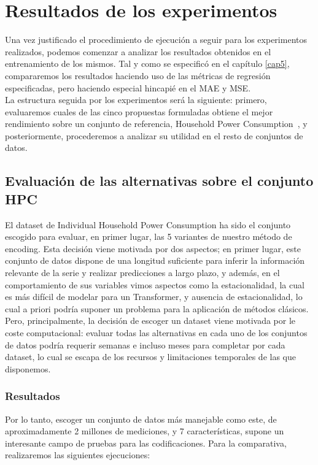 \section{Resultados de los experimentos}

Una vez justificado el procedimiento de ejecución a seguir para los experimentos realizados, podemos comenzar a analizar los resultados obtenidos en el entrenamiento de los mismos. Tal y como se especificó en el capítulo \ref{cap5}, compararemos los resultados haciendo uso de las métricas de regresión especificadas, pero haciendo especial hincapié en el MAE y MSE.\\

La estructura seguida por los experimentos será la siguiente: primero, evaluaremos cuales de las cinco propuestas formuladas obtiene el mejor rendimiento sobre un conjunto de referencia, Household Power Consumption~\cite{hebrail2006individual}, y posteriormente, procederemos a analizar su utilidad en el resto de conjuntos de datos.

\subsection{Evaluación de las alternativas sobre el conjunto HPC}

El dataset de Individual Household Power Consumption ha sido el conjunto escogido para evaluar, en primer lugar, las 5 variantes de nuestro método de encoding. Esta decisión viene motivada por dos aspectos; en primer lugar, este conjunto de datos dispone de una longitud suficiente para inferir la información relevante de la serie y realizar predicciones a largo plazo, y además, en el comportamiento de sus variables vimos aspectos como la estacionalidad, la cual es más difícil de modelar para un Transformer, y ausencia de estacionalidad, lo cual a priori podría suponer un problema para la aplicación de métodos clásicos. Pero, principalmente, la decisión de escoger un dataset viene motivada por le coste computacional: evaluar todas las alternativas en cada uno de los conjuntos de datos podría requerir semanas e incluso meses para completar por cada dataset, lo cual se escapa de los recursos y limitaciones temporales de las que disponemos.\\

\subsubsection{Resultados}

Por lo tanto, escoger un conjunto de datos más manejable como este, de aproximadamente 2 millones de mediciones, y 7 características, supone un interesante campo de pruebas para las codificaciones. Para la comparativa, realizaremos las siguientes ejecuciones:

